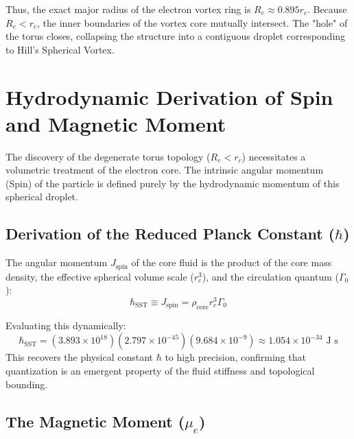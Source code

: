 \documentclass[11pt]{article}
\newcommand{\rc}{r_c}                                    %
\newcommand{\rhocore}{\rho_{\text{core}}}
\newcommand{\GammaSST}{\Gamma_0}
\begin{document}
            Thus, the exact major radius of the electron vortex ring is $R_e \approx 0.895 \rc$. Because $R_e < \rc$, the inner boundaries of the vortex core mutually intersect. The "hole" of the torus closes, collapsing the structure into a contiguous droplet corresponding to Hill's Spherical Vortex.

    \section{Hydrodynamic Derivation of Spin and Magnetic Moment}
        \label{sec:spin_magnetic}

        The discovery of the degenerate torus topology ($R_e < \rc$) necessitates a volumetric treatment of the electron core. The intrinsic angular momentum (Spin) of the particle is defined purely by the hydrodynamic momentum of this spherical droplet.

        \subsection{Derivation of the Reduced Planck Constant ($\hbar$)}

            The angular momentum $J_{\text{spin}}$ of the core fluid is the product of the core mass density, the effective spherical volume scale ($\rc^3$), and the circulation quantum ($\GammaSST$):
            \begin{equation}
                \hbar_{\text{SST}} \equiv J_{\text{spin}} = \rhocore \rc^3 \GammaSST
            \end{equation}

            Evaluating this dynamically:
            \begin{equation}
                \hbar_{\text{SST}} = (3.893 \times 10^{18}) (2.797 \times 10^{-45}) (9.684 \times 10^{-9}) \approx 1.054 \times 10^{-34} \text{ J s}
            \end{equation}
            This recovers the physical constant $\hbar$ to high precision, confirming that quantization is an emergent property of the fluid stiffness and topological bounding.

        \subsection{The Magnetic Moment ($\mu_e$)}
\end{document}
